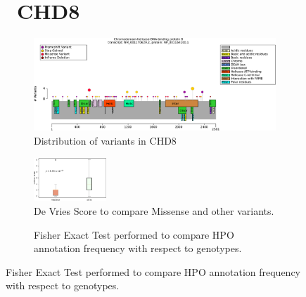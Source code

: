 \begin{figure}[htbp]
\section*{ CHD8}
\centering
\begin{subfigure}[b]{0.95\textwidth}
\centering
\includegraphics[width=\textwidth]{ img/CHD8_protein_diagram.pdf} 
\captionsetup{justification=raggedright,singlelinecheck=false}
\caption{Distribution of variants in CHD8}
\end{subfigure}

\vspace{2em}

\begin{subfigure}[b]{0.95\textwidth}
\centering
\includegraphics[width=0.3\textwidth]{img/CHD8_stats.pdf} 
\captionsetup{justification=raggedright,singlelinecheck=false}
\caption{De Vries Score to compare Missense and other variants.}
\end{subfigure}

\vspace{2em}

\begin{subfigure}[b]{0.95\textwidth}
\centering
{}
\captionsetup{justification=raggedright,singlelinecheck=false}
\caption{Fisher Exact Test performed to compare HPO annotation frequency with respect to genotypes.}
\end{subfigure}


\end{figure}
